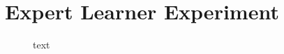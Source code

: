 \section{Expert Learner Experiment}

\begin{figure}[h]
	\centering
	
	\caption{text}
\end{figure}



